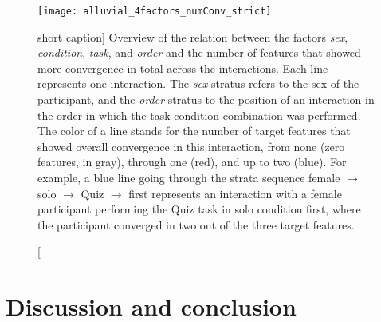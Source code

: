 \begin{figure}[t]
	\centering
	\texttt{[image: alluvial\_4factors\_numConv\_strict]}
	\caption
		[short caption]
		{Overview of the relation between the factors \emph{sex}, \emph{condition}, \emph{task}, and \emph{order} and the number of features that showed more convergence in total across the interactions.
		Each line represents one interaction.
		The \emph{sex} stratus refers to the sex of the participant, and the \emph{order} stratus to the position of an interaction in the order in which the task-condition combination was performed.
		The color of a line stands for the number of target features that showed overall convergence in this interaction, from none (zero features, in gray), through one (red), and up to two (blue).
		For example, a blue line going through the strata sequence female $\rightarrow$ solo $\rightarrow$ Quiz $\rightarrow$ first represents an interaction with a female participant performing the Quiz task in solo condition first, where the participant converged in two out of the three target features.}
	\label{fig:alluvial}
\end{figure}


\section{Discussion and conclusion}
\label{sec:discussion_and_conclusion}

